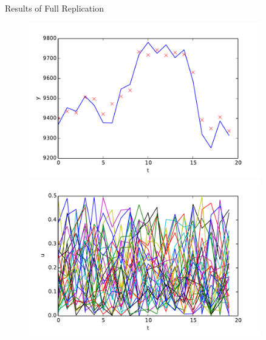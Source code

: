 \documentclass[handout]{beamer}
\begin{document}
\begin{frame}{Results of Full Replication}
   \begin{figure}
    \centering
    \includegraphics[width = 0.9\textwidth, height=0.4\textheight]{figures/DAXFull-y.pdf}\\
    \includegraphics[width = 0.9\textwidth, height=0.4\textheight]{figures/DAXFull-u.pdf}
   \end{figure}
\end{frame}
\end{document}
